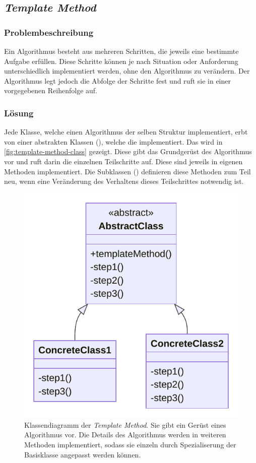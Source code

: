 \subsection{\emph{Template Method}}

\subsubsection*{Problembeschreibung}

Ein Algorithmus besteht aus mehreren Schritten, die jeweils eine bestimmte Aufgabe erfüllen. Diese Schritte können je nach Situation oder Anforderung unterschiedlich implementiert werden, ohne den Algorithmus zu verändern. Der Algorithmus legt jedoch die Abfolge der Schritte fest und ruft sie in einer vorgegebenen Reihenfolge auf. \cite{gamma_design_1995}

\subsubsection*{Lösung}

Jede Klasse, welche einen Algorithmus der selben Struktur implementiert, erbt von einer abstrakten Klassen (), welche die  implementiert. Das wird in \autoref{fig:template-method-class} gezeigt. Diese gibt das Grundgerüst des Algorithmus vor und ruft darin die einzelnen Teilschritte auf. Diese sind jeweils in eigenen Methoden implementiert. Die Subklassen () definieren diese Methoden zum Teil neu, wenn eine Veränderung des Verhaltens dieses Teilschrittes notwendig ist.

\begin{figure}[!ht]
	\centering
	\includegraphics[width=0.75\linewidth]{images/patterns/template-method-class.pdf}
	\caption{Klassendiagramm der \emph{Template Method}. Sie gibt ein Gerüst eines Algorithmus vor. Die Details des Algorithmus werden in weiteren Methoden implementiert, sodass sie einzeln durch Spezialiserung der Basisklasse angepasst werden können. \cite{skobeleva_template_2023}}
	\label{fig:template-method-class}
\end{figure}

